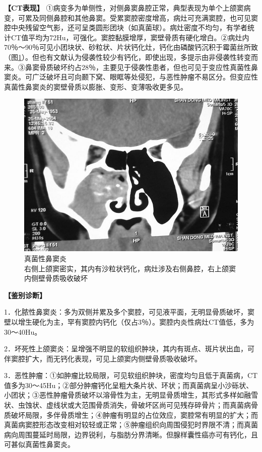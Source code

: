 \textbf{【CT表现】}
①病变多为单侧性，对侧鼻窦鼻腔正常，典型表现为单个上颌窦病变，可累及同侧鼻腔和其他鼻窦。受累窦腔密度增高，病灶可充满窦腔，也可见窦腔中央残留空气影，还可呈类圆形团块（如真菌球）。病灶密度不均匀，有学者统计CT值平均为72Hu，可强化。窦腔黏膜增厚，窦壁骨质有硬化增白。②病灶内70％～90％可见小团块状、砂粒状、片状钙化灶，钙化由磷酸钙沉积于霉菌丝所致（图\ref{fig5-7}）。但也有文献认为侵袭性较少有钙化，即使出现，多提示由非侵袭性转变而来。③鼻窦骨质破坏约占28％，主要见于侵袭性患者，但也可见于变应性真菌性鼻窦炎。可广泛破坏且可向颞下窝、眼眶等处侵犯，与恶性肿瘤不易区分。但变应性真菌性鼻窦炎的窦壁骨质以膨胀、变形、变薄吸收更多见。

\begin{figure}[!htbp]
 \centering
 \includegraphics[width=.7\textwidth,height=\textheight,keepaspectratio]{./images/Image00129.jpg}
 \captionsetup{justification=centering}
 \caption{真菌性鼻窦炎\\{\small 右侧上颌窦密实，其内有沙粒状钙化，病灶涉及右侧鼻腔，右上颌窦内侧壁骨质吸收破坏}}
 \label{fig5-7}
  \end{figure} 

\textbf{【鉴别诊断】}

1．化脓性鼻窦炎：多为双侧并累及多个窦腔，可见液平面，无明显骨质破坏，窦壁以增生硬化为主，罕有窦腔内钙化（仅占3％）。窦腔内炎性病灶CT值低，多为30～40Hu。

2．坏死性上颌窦炎：呈增强不明显的软组织肿块，其内有斑点、斑片状出血，可伴窦腔扩大，而无钙化表现，可见上颌窦内侧壁骨质吸收破坏。

3．恶性肿瘤：①如肿瘤比较局限，可见软组织肿块，密度均匀且低于真菌病，CT值多为30～45Hu；②部分肿瘤钙化呈粗大条片状、环状；而真菌病呈小沙砾状、小团状；③恶性肿瘤骨质破坏以溶骨性为主，无明显骨质增生，其形式多样如融雪状、虫蚀状、虚线状或大范围骨质消失，骨破坏区尚可见残存碎骨片；而真菌病骨质破坏局限，多伴骨质增生；④肿瘤有明显的占位效应，窦腔常有明显的扩大；而真菌病窦腔形态改变相对较轻或正常；⑤肿瘤组织向周围侵犯时界限不清；而真菌病向周围蔓延时局限，边界锐利，与脂肪分界清晰。但腺样囊性癌亦可有钙化，且可甚似真菌性鼻窦炎。

